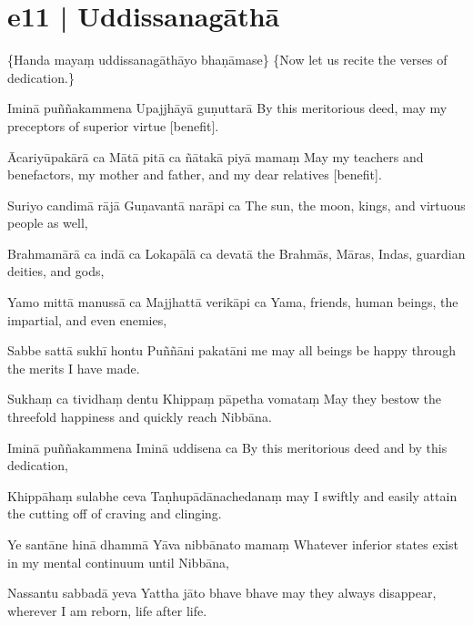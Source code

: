 \section*{e11 | Uddissanagāthā}

\begin{chantsubsection}
  \chantnote
    {\{Handa mayaṃ uddissanagāthāyo bhaṇāmase\}}
  \chantnotetrans
    {\{Now let us recite the verses of dedication.\}}
\end{chantsubsection}

\begin{chantsubsection}
  \chantlinepair
    {Iminā puññakammena}
    {Upajjhāyā guṇuttarā}
    {By this meritorious deed, may my preceptors of superior virtue [benefit].}

  \chantlinepair
    {Ācariyūpakārā ca}
    {Mātā pitā ca ñātakā piyā mamaṃ}
    {May my teachers and benefactors, my mother and father, and my dear relatives [benefit].}

  \chantlinepair
    {Suriyo candimā rājā}
    {Guṇavantā narāpi ca}
    {The sun, the moon, kings, and virtuous people as well,}

  \chantlinepair
    {Brahmamārā ca indā ca}
    {Lokapālā ca devatā}
    {the Brahmās, Māras, Indas, guardian deities, and gods,}

  \chantlinepair
    {Yamo mittā manussā ca}
    {Majjhattā verikāpi ca}
    {Yama, friends, human beings, the impartial, and even enemies,}

  \chantlinepair
    {Sabbe sattā sukhī hontu}
    {Puññāni pakatāni me}
    {may all beings be happy through the merits I have made.}

  \chantlinepair
    {Sukhaṃ ca tividhaṃ dentu}
    {Khippaṃ pāpetha vomataṃ}
    {May they bestow the threefold happiness and quickly reach Nibbāna.}

  \chantlinepair
    {Iminā puññakammena}
    {Iminā uddisena ca}
    {By this meritorious deed and by this dedication,}

  \chantlinepair
    {Khippāhaṃ sulabhe ceva}
    {Taṇhupādānachedanaṃ}
    {may I swiftly and easily attain the cutting off of craving and clinging.}

  \chantlinepair
    {Ye santāne hinā dhammā}
    {Yāva nibbānato mamaṃ}
    {Whatever inferior states exist in my mental continuum until Nibbāna,}

  \chantlinepair
    {Nassantu sabbadā yeva}
    {Yattha jāto bhave bhave}
    {may they always disappear, wherever I am reborn, life after life.}


\end{chantsubsection}
